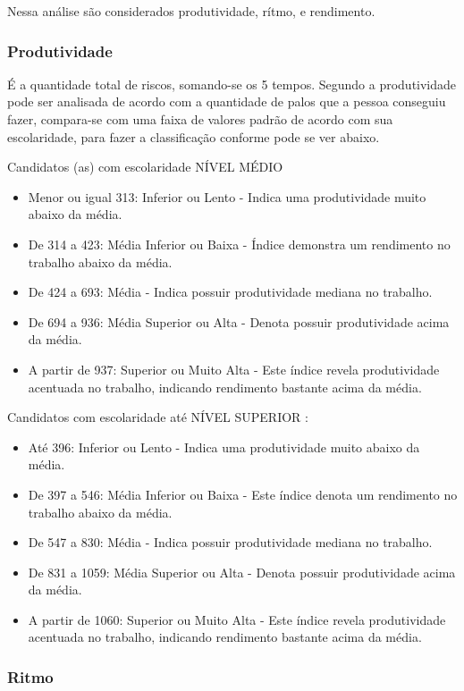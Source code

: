 Nessa análise são considerados produtividade, rítmo, e rendimento.

\subsubsection{Produtividade}
\label{subsub:avaquali}

É a quantidade total de riscos, somando-se os 5 tempos.
Segundo \cite{marcosjaime2013}  a produtividade pode ser analisada de acordo com a quantidade de palos que a pessoa conseguiu fazer, compara-se com uma faixa de valores padrão de acordo com sua escolaridade, para fazer a classificação conforme pode se ver abaixo.

Candidatos (as) com escolaridade NÍVEL MÉDIO
\begin{itemize}
\item Menor ou igual 313: Inferior ou Lento - Indica uma produtividade muito abaixo da média.
\item De 314 a 423: Média Inferior ou Baixa - Índice demonstra um rendimento no trabalho abaixo da média.
\item De 424 a 693: Média - Indica possuir produtividade mediana no trabalho.
\item De 694 a 936: Média Superior ou Alta - Denota possuir produtividade acima da média.
\item  A partir de 937: Superior ou Muito Alta - Este índice revela produtividade acentuada no trabalho, indicando rendimento bastante acima da média.
\end{itemize}

Candidatos com escolaridade até NÍVEL SUPERIOR :

\begin{itemize}
\item Até 396: Inferior ou Lento - Indica uma produtividade muito abaixo da média.
\item De 397 a 546: Média Inferior ou Baixa - Este índice denota um rendimento no trabalho abaixo da média.
\item De 547 a 830: Média - Indica possuir produtividade mediana no trabalho.
\item De 831 a 1059: Média Superior ou Alta - Denota possuir produtividade acima da média.
\item A partir de 1060: Superior ou Muito Alta - Este índice revela produtividade acentuada no
trabalho, indicando rendimento bastante acima da média.
\end{itemize}

\subsubsection{Ritmo}
\label{subsub:ritmo}

